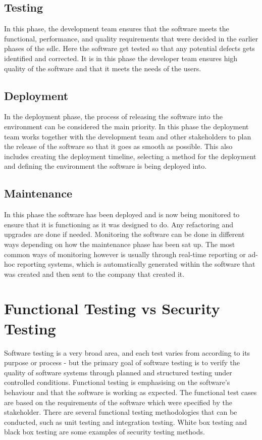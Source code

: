  \subsection{Testing}
 In this phase, the development team ensures that the software meets the functional, performance, and quality requirements that were decided in the earlier phases of the \acrshort{sdlc}. Here the software get tested so that any potential defects gets identified and corrected. It is in this phase the developer team ensures high quality of the software and that it meets the needs of the users. \cite{TestingSDLC}
 
\subsection{Deployment}
In the deployment phase, the process of releasing the software into the environment can be considered the main priority. In this phase the deployment team works together with the development team and other stakeholders to plan the release of the software so that it goes as smooth as possible. This also includes creating the deployment timeline, selecting a method for the deployment and defining the environment the software is being deployed into. \cite{DeploymentSDLC}

\subsection{Maintenance} 
In this phase the software has been deployed and is now being monitored to ensure that it is functioning as it was designed to do. Any refactoring and upgrades are done if needed. Monitoring the software can be done in different ways depending on how the maintenance phase has been sat up. The most common ways of monitoring however is usually through real-time reporting or ad-hoc reporting systems, which is automatically generated within the software that was created and then sent to the company that created it.\cite{MaintenanceSDLC} 

\section{Functional Testing vs Security Testing}
Software testing is a very broad area, and each test varies from according to its purpose or process - but the primary goal of software testing is to verify the quality of software systems through planned and structured testing under controlled conditions. Functional testing is emphasising on the software's behaviour and that the software is working as expected. The functional test cases are based on the requirements of the software which were specified by the stakeholder. There are several functional testing methodologies that can be conducted, such as unit testing and integration testing. White box testing and black box testing are some examples of security testing methods.
\cite{difftesting} 

